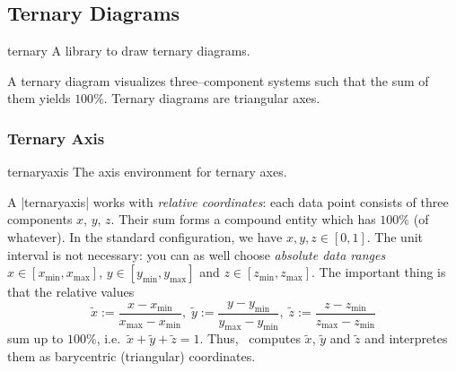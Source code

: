 \subsection{Ternary Diagrams}

\begin{pgfplotslibrary}{ternary}
	A library to draw ternary diagrams.

	A ternary diagram visualizes three--component systems such that the sum of them yields $100\%$. Ternary diagrams are triangular axes.
\end{pgfplotslibrary}


\subsubsection{Ternary Axis}
\begin{environment}{{ternaryaxis}}
	The axis environment for ternary axes.


\begin{codeexample}[]
\end{codeexample}

	A |ternaryaxis| works with \emph{relative coordinates}: each data point consists of three components $x$, $y$, $z$. Their sum forms a compound entity which has $100\%$ (of whatever). In the standard configuration, we have $x,y,z \in [0,1]$. The unit interval is not necessary: you can as well choose \emph{absolute data ranges} $x \in [x_{\text{min}},x_{\text{max}}]$, $y \in [y_{\text{min}},y_{\text{max}}]$ and $z \in [z_{\text{min}},z_{\text{max}}]$. The important thing is that the relative values 
	\[ \tilde x := \frac{x-x_{\text{min}}}{x_{\text{max}} - x_{\text{min}}},\;
	   \tilde y := \frac{y-y_{\text{min}}}{y_{\text{max}} - y_{\text{min}}},\;
	   \tilde z := \frac{z-z_{\text{min}}}{z_{\text{max}} - z_{\text{min}}} \]
	sum up to $100\%$, i.e.\ $\tilde x + \tilde y + \tilde z = 1$. Thus, \PGFPlots\ computes $\tilde x$, $\tilde y$ and $\tilde z$ and interpretes them as barycentric (triangular) coordinates.


\end{environment}
